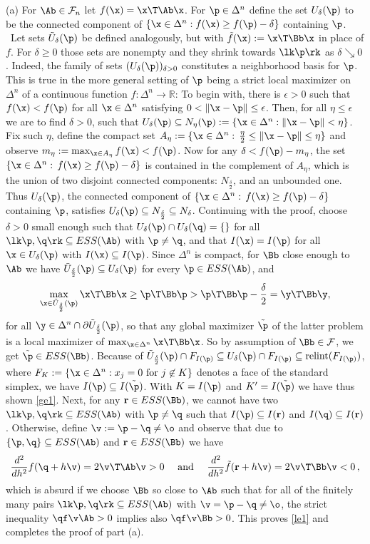 \documentclass[moor]{informs3}              %
\newcommand{\rr}{{\mathbf{r}}}
\def\cowe#1{{#1}} %
\begin{document}
\bep (a) For $\Ab\in\mathcal{F}_n$ let $f(\x)=\x\T\Ab\x$. For $\p\in \Delta^n$ define the set $U_\delta(\p)$ to be the connected component of $\{\x\in\Delta^n:f(\x)\ge f(\p)-\delta\}$ containing $\p$. \
Let sets $\tilde U_\delta(\p)$ be defined analogously, but with $\tilde f(\x):=\x\T\Bb\x$ in place of $f$.
For $\delta\ge0$ those sets are nonempty and they shrink towards $\lk \p\rk$ as $\delta\searrow 0$. Indeed,
the family of sets $(U_\delta(\p))_{\delta>0}$ constitutes a neighborhood basis for $\p$. This is true in the more general setting of $\p$ being a strict local maximizer on $\Delta^n$ of a continuous function
$f:\Delta^n\to\mathbb{R}$: To begin with, there is $\epsilon>0$ such that $f(\x)<f(\p)$ for all $\x\in\Delta^n$ satisfying $0<\|\x-\p\|\le\epsilon$. Then, for all $\eta\le\epsilon$ we are to find
$\delta>0$, such that $U_\delta(\p)\subseteq N_\eta(\p):=\{\x\in\Delta^n:\|\x-\p\|<\eta\}$. Fix such $\eta$, define the compact set
$A_\eta:=\{\x\in\Delta^n:\,\frac\eta2\le\|\x-\p\|\le\eta\}$ and observe $m_\eta:=\max_{\x\in A_\eta}f(\x)<f(\p)$.
Now for any $\delta<f(\p)-m_\eta$, the set $\{\x\in\Delta^n:\,f(\x)\ge f(\p)-\delta\}$ is contained in the complement of $A_\eta$, which is the union of two disjoint connected components: $N_{\frac\delta2}$, and an unbounded one.
Thus $U_\delta(\p)$, the connected component of $\{\x\in\Delta^n:\,f(\x)\ge f(\p)-\delta\}$ containing $\p$, satisfies $U_\delta(\p)\subseteq N_{\frac\delta2}\subseteq N_\delta$.
Continuing with the proof, choose $\delta>0$ small enough such that $U_\delta(\p)\cap U_\delta(\q)=\{\}$ for all $\lk\p,\q\rk\subseteq ESS(\Ab)$ with $\p\ne\q$, and that
$I(\x)=I(\p)$ for all $\x\in U_\delta(\p)$ with $I(\x)\subseteq I(\p)$. Since $\Delta^n$ is compact, for $\Bb$ close enough to $\Ab$ we have $\tilde U_{\frac\delta2}(\p)\subseteq U_\delta(\p)$ for every $\p\in ESS(\Ab)$, and
$$\max_{\x \in \tilde U_{\frac\delta2}(\p)} \x \T \Bb \x \ge \p\T\Bb\p>\p\T\Bb\p-\frac\delta2=\y \T \Bb \y,$$
for all \cowe{$\y \in \Delta^n\cap\partial\tilde U_{\frac\delta2}(\p)$}, %
so that any global maximizer $\tilde \p$ of the latter problem is a local maximizer of $\max_{\x \in \Delta^n} \x \T \Bb \x$. So by assumption of $\Bb\in\mathcal F$, we get $\tilde \p\in ESS(\Bb)$.
Because of $\tilde U_{\frac\delta2}(\p)\cap F_{I(\p)}\subseteq U_{\delta}(\p)\cap F_{I(\p)}\subseteq \textup{relint}(F_{I(\p)})$,
where $F_K:=\{\x\in\Delta^n: x_j=0\textup{ for }j\not\in K\}$ denotes a face of the standard simplex,
we have $I(\p)\subseteq I(\tilde\p)$.
With $K=I(\p)$ and $K'=I(\tilde\p)$ we have thus shown \eqref{ge1}. Next, for any $\rr\in ESS(\Bb)$, we cannot have two $\lk \p,\q\rk\subseteq ESS(\Ab)$ with $\p\ne\q$ such that $I(\p)\subseteq I(\rr)$ and $I(\q)\subseteq I(\rr)$. Otherwise, define $\v:=\p-\q\neq \o$ and observe that due to $\{\p,\q\}\subseteq ESS(\Ab)$ and $\rr\in ESS(\Bb)$ we have
$$\frac {d^2}{dh^2}f(\q+h\v)=2\v\T\Ab\v>0\quad\textup{ and }\quad\frac {d^2}{dh^2}\tilde f(\rr+h\v)=2\v\T\Bb\v<0\, ,$$
which is absurd if we choose $\Bb$ so close to $\Ab$ such that for all of the finitely many pairs $\lk\p,\q\rk\subseteq ESS (\Ab)$ with $\v=\p-\q\neq \o$, the strict inequality
$\qf\v\Ab >0$ implies also $\qf\v\Bb>0$. This proves \eqref{le1} and completes the proof of part (a).
\end{document}
